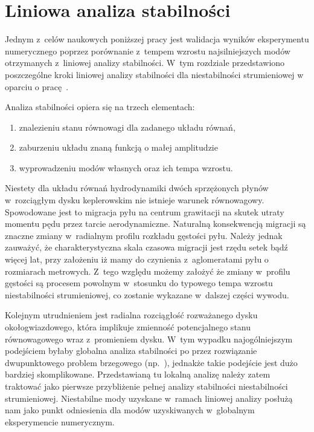 
\chapter{Liniowa analiza stabilności}
\label{sec:lsa}
Jednym z~celów naukowych poniższej pracy jest walidacja wyników eksperymentu
numerycznego poprzez porównanie z~tempem wzrostu najsilniejszych modów
otrzymanych z~liniowej analizy stabilności. W~tym rozdziale przedstawiono
poszczególne kroki liniowej analizy stabilności dla niestabilności strumieniowej
w oparciu o pracę~\citep{YG05}.

Analiza stabilności opiera się na trzech elementach:
\begin{enumerate}
   \item znalezieniu stanu równowagi dla zadanego układu równań,
   \item zaburzeniu układu znaną funkcją o małej amplitudzie 
   \item wyprowadzeniu modów własnych oraz ich tempa wzrostu.
\end{enumerate}
Niestety dla układu równań hydrodynamiki dwóch sprzężonych płynów w~rozciągłym
dysku keplerowskim nie istnieje warunek równowagowy. Spowodowane jest to
migracja pyłu na centrum grawitacji na skutek utraty momentu pędu przez tarcie
aerodynamiczne. Naturalną konsekwencją migracji są znaczne zmiany w~radialnym
profilu rozkładu gęstości pyłu. Należy jednak zauważyć, że charakterystyczna
skala czasowa migracji jest rzędu setek bądź więcej lat, przy założeniu iż mamy
do czynienia z~aglomeratami pyłu o rozmiarach metrowych. Z~tego względu możemy
założyć że zmiany w~profilu gęstości są procesem powolnym w~stosunku do typowego
tempa wzrostu niestabilności strumieniowej, co zostanie wykazane w~dalszej
części wywodu.

Kolejnym utrudnieniem jest radialna rozciągłość rozważanego dysku
okołogwiazdowego, która implikuje zmienność potencjalnego stanu równowagowego
wraz z~promieniem dysku. W~tym wypadku najogólniejszym podejściem byłaby
globalna analiza stabilności po przez rozwiązanie dwupunktowego problem
brzegowego (np.~\cite{PHM04, KH06}), jednakże takie podejście jest dużo bardziej
skomplikowane. Przedstawianą tu lokalną analizę należy zatem traktować jako
pierwsze przybliżenie pełnej analizy stabilności niestabilności strumieniowej.
Niestabilne mody uzyskane w~ramach liniowej analizy posłużą nam jako punkt
odniesienia dla modów uzyskiwanych w~globalnym eksperymencie numerycznym.

